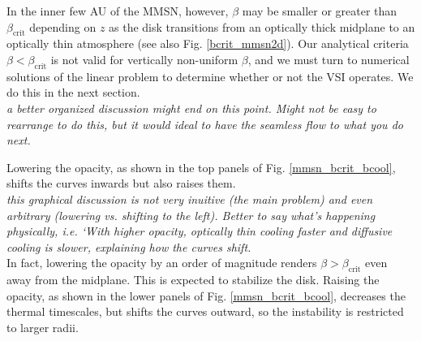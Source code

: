 In the inner few AU of the MMSN, however, $\beta$ 
may be smaller or greater than $\beta_\mathrm{crit}$ depending on
$z$ as the disk transitions from an optically thick midplane to an
optically thin atmosphere (see also Fig. \ref{bcrit_mmsn2d}). 
Our analytical criteria $\beta < \beta_\mathrm{crit}$ is not valid for
vertically non-uniform $\beta$, and we must turn to numerical
solutions of the linear problem to determine whether or not the VSI
operates. We do this in the next section.    \\
\emph{a better organized discussion might end on this point.  Might not be easy to rearrange to do this, but it would ideal to have the seamless flow to what you do next.}
 
Lowering the opacity, as shown in the top panels of
Fig. \ref{mmsn_bcrit_bcool}, shifts the curves inwards but also raises
them.\\
\emph{this graphical discussion is not very inuitive (the main problem) and even arbitrary (lowering vs. shifting to the left).  Better to say what's happening physically, i.e. `With higher opacity, optically thin cooling faster and diffusive cooling is slower, explaining how the curves shift.} \\
In fact, lowering the opacity by an order of magnitude renders  
$\beta > \beta_\mathrm{crit}$ even away from the midplane. This is 
expected to stabilize the disk. Raising the opacity, as shown in 
the lower panels of Fig. \ref{mmsn_bcrit_bcool}, decreases the thermal
timescales, but shifts the curves outward, so the instability is
restricted to larger radii.  

